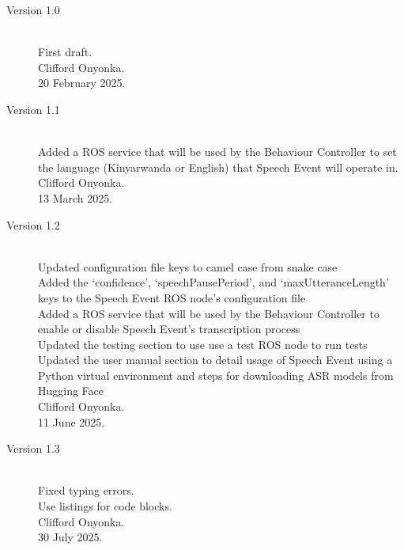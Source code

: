 \documentclass{CSSRforAfrica}
\begin{document}
\begin{description}

\item [Version 1.0]~\\
First draft. \\
Clifford Onyonka. \\                                     %
20 February 2025.                                                        %

\item [Version 1.1]~\\
Added a ROS service that will be used by the Behaviour Controller to set the language (Kinyarwanda or English) that Speech Event will operate in. \\
Clifford Onyonka. \\
13 March 2025.

\item [Version 1.2]~\\
Updated configuration file keys to camel case from snake case \\
Added the `confidence', `speechPausePeriod', and `maxUtteranceLength' keys to the Speech Event ROS node's configuration file \\
Added a ROS service that will be used by the Behaviour Controller to enable or disable Speech Event's transcription process \\
Updated the testing section to use use a test ROS node to run tests \\
Updated the user manual section to detail usage of Speech Event using a Python virtual environment and steps for downloading ASR models from Hugging Face \\
Clifford Onyonka. \\
11 June 2025.

\item [Version 1.3]~\\
Fixed typing errors.\\
Use listings for code blocks.\\
Clifford Onyonka. \\
30 July 2025.



\end{description}
\end{document}
